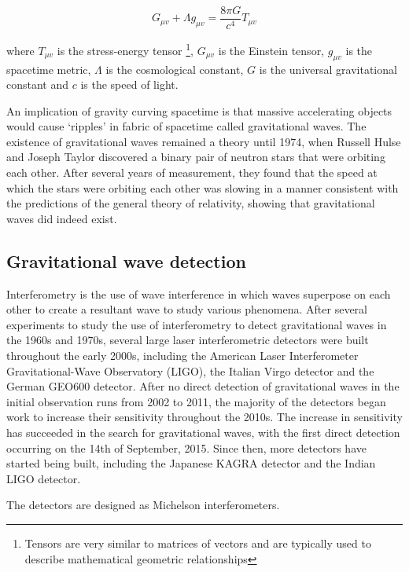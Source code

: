 \documentclass{article}
\begin{document}
\begin{equation}
    G_{\mu{}v} + \Lambda{}g_{\mu{}v} = \dfrac{8\pi{}G}{c^4}T_{\mu{}v}
\end{equation}

where \(T_{\mu{}v}\) is the stress-energy tensor \footnote{Tensors are very similar to matrices of
vectors and are typically used to describe mathematical geometric relationships}, \(G_{\mu{}v}\) is
the Einstein tensor, \(g_{\mu{}v}\) is the spacetime metric, \(\Lambda\) is the cosmological
constant, \(G\) is the universal gravitational constant and \(c\) is the speed of light.

An implication of gravity curving spacetime is that massive accelerating objects would cause
`ripples' in fabric of spacetime called gravitational waves. The existence of gravitational waves
remained a theory until 1974, when Russell Hulse and Joseph Taylor discovered a binary pair of
neutron stars that were orbiting each other. After several years of measurement, they found that
the speed at which the stars were orbiting each other was slowing in a manner consistent with the
predictions of the general theory of relativity, showing that gravitational waves did indeed exist.

\subsection{Gravitational wave detection}

Interferometry is the use of wave interference \textendash{} in which waves superpose on each other
to create a resultant wave \textendash{} to study various phenomena. After several experiments to
study the use of interferometry to detect gravitational waves in the 1960s and 1970s, several large
laser interferometric detectors were built throughout the early 2000s, including the American Laser
Interferometer Gravitational-Wave Observatory (LIGO), the Italian Virgo detector and the German
GEO600 detector. After no direct detection of gravitational waves in the initial observation runs
from 2002 to 2011, the majority of the detectors began work to increase their sensitivity throughout
the 2010s. The increase in sensitivity has succeeded in the search for gravitational waves, with the
first direct detection occurring on the 14th of September, 2015. Since then, more detectors have
started being built, including the Japanese KAGRA detector and the Indian LIGO detector.

The detectors are designed as Michelson interferometers.
%
\end{document}
